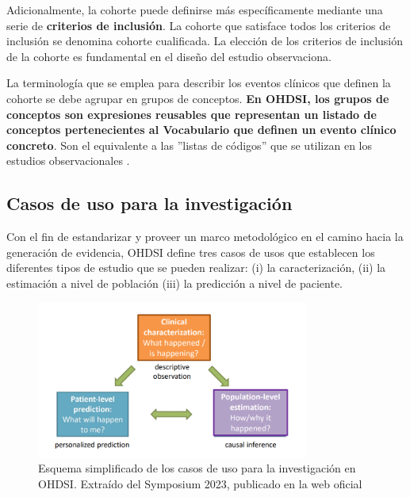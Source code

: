 Adicionalmente, la cohorte puede definirse más específicamente mediante una serie de \textbf{criterios de inclusión}. La cohorte que satisface todos los criterios de inclusión se denomina cohorte cualificada. La elección de los criterios de inclusión de la cohorte es fundamental en el diseño del estudio observaciona.

La terminología que se emplea para describir los eventos clínicos que definen la cohorte se debe agrupar en grupos de conceptos. \textbf{En OHDSI, los grupos de conceptos son expresiones reusables que representan un listado de conceptos pertenecientes al Vocabulario que definen un evento clínico concreto}.  Son el equivalente a las ''listas de códigos'' que se utilizan en los estudios observacionales \cite{OHDSIbook}.

\subsection{Casos de uso para la investigación} \label{subsec:05casosUso}

Con el fin de estandarizar y proveer un marco metodológico en el camino hacia la generación de evidencia, OHDSI define tres casos de usos que establecen los diferentes tipos de estudio que se pueden realizar: (i) la caracterización, (ii) la estimación a nivel de población (iii) la predicción a nivel de paciente.

\begin{figure}[H]
\centering
\includegraphics[width=0.80\textwidth]{figures/useCases.png}
     \caption{Esquema simplificado de los casos de uso para la investigación en OHDSI. Extraído del Symposium 2023, publicado en la web oficial \cite{OHDSIwebsite}}
    \label{fig:useCases}
\end{figure}


